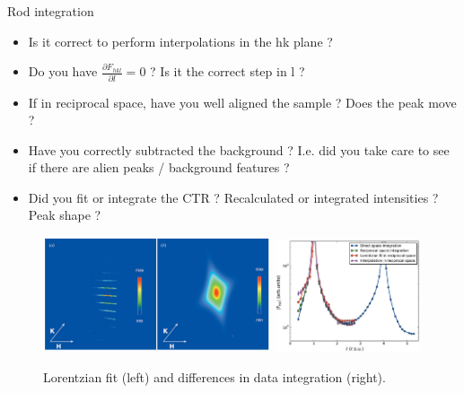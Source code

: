 \begin{frame}{Rod integration}

    \begin{itemize}
        \item Is it correct to perform interpolations in the hk plane ?
        \item Do you have $\frac{\partial F_{hkl}}{\partial l} = 0$ ? Is it the correct step in l ?
        \item If in reciprocal space, have you well aligned the sample ? Does the peak move ?
        \item Have you correctly subtracted the background ? I.e. did you take care to see if there are alien peaks / background features ?
        \item Did you fit or integrate the CTR ? Recalculated  or integrated intensities ? Peak shape ?
    \end{itemize}

    \begin{figure}
        \centering
        \includegraphics[width=0.6\textwidth]{Figures/sxrd_data/LorentzianFit.png}
        \includegraphics[width=0.38\textwidth]{Figures/sxrd_data/int_dif_sxrd.png}
        \caption{Lorentzian fit (left) and differences in data integration (right).}
        \label{fig:sxrd_data}
    \end{figure}
    
\end{frame}